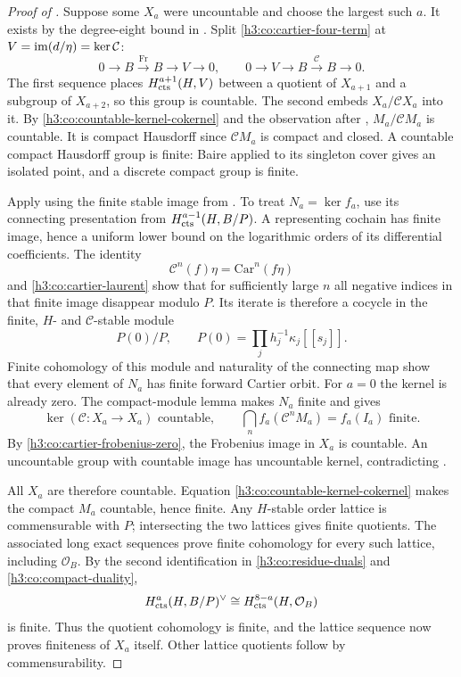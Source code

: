 \begin{proof}[Proof of ]
Suppose some $X_a$ were uncountable and choose the largest such $a$.
It exists by the degree-eight bound in
.  Split \eqref{h3:co:cartier-four-term} at
$V=\operatorname{im}(d/\eta)=\ker\mathcal C$:
\[
 0\longrightarrow B\xrightarrow{\mathrm{Fr}}B\longrightarrow V
 \longrightarrow0,
 \qquad
 0\longrightarrow V\longrightarrow B\xrightarrow{\mathcal C}B
 \longrightarrow0.
\]
The first sequence places $H^{a+1}_{\mathrm{cts}}(H,V)$ between a quotient of
$X_{a+1}$ and a subgroup of $X_{a+2}$, so this group is countable.
The second embeds $X_a/\mathcal C X_a$ into it.  By
\eqref{h3:co:countable-kernel-cokernel} and the observation after
, $M_a/\mathcal C M_a$ is countable.
It is compact Hausdorff since $\mathcal C M_a$ is compact and closed.
A countable compact Hausdorff group is finite: Baire applied to its
singleton cover gives an isolated point, and a discrete compact group
is finite.

Apply  using the finite stable image from
.  To treat $N_a=\ker f_a$, use its connecting
presentation from $H^{a-1}_{\mathrm{cts}}(H,B/P)$.  A representing cochain has
finite image, hence a uniform lower bound on the logarithmic orders of
its differential coefficients.  The identity
\[
 \mathcal C^n(f)\eta=\mathrm{Car}^n(f\eta)
\]
and \eqref{h3:co:cartier-laurent} show that for sufficiently large $n$ all
negative indices in that finite image disappear modulo $P$.
Its iterate is therefore a cocycle in the finite, $H$- and
$\mathcal C$-stable module
\[
 P(0)/P,\qquad
 P(0)=\prod_jh_j^{-1}\kappa_j[[s_j]].
\]
Finite cohomology of this module and naturality of the connecting map
show that every element of $N_a$ has finite forward Cartier orbit.
For $a=0$ the kernel is already zero.  The compact-module lemma makes
$N_a$ finite and gives
\[
 \ker(\mathcal C:X_a\to X_a)\text{ countable},\qquad
 \bigcap_n f_a(\mathcal C^nM_a)=f_a(I_a)\text{ finite}.
\]
By \eqref{h3:co:cartier-frobenius-zero}, the Frobenius image in $X_a$ is
countable.  An uncountable group with countable image has uncountable
kernel, contradicting .

All $X_a$ are therefore countable.  Equation
\eqref{h3:co:countable-kernel-cokernel} makes the compact $M_a$ countable,
hence finite.  Any $H$-stable order lattice is commensurable with $P$;
intersecting the two lattices gives finite quotients.  The associated
long exact sequences prove finite cohomology for every such lattice,
including $\mathcal O_B$.  By the second identification in
\eqref{h3:co:residue-duals} and \eqref{h3:co:compact-duality},
\[
 H^a_{\mathrm{cts}}(H,B/P)^\vee
 \cong H^{8-a}_{\mathrm{cts}}(H,\mathcal O_B)
\]
is finite.  Thus the quotient cohomology is finite, and the lattice
sequence now proves finiteness of $X_a$ itself.  Other lattice quotients
follow by commensurability.


\end{proof}
